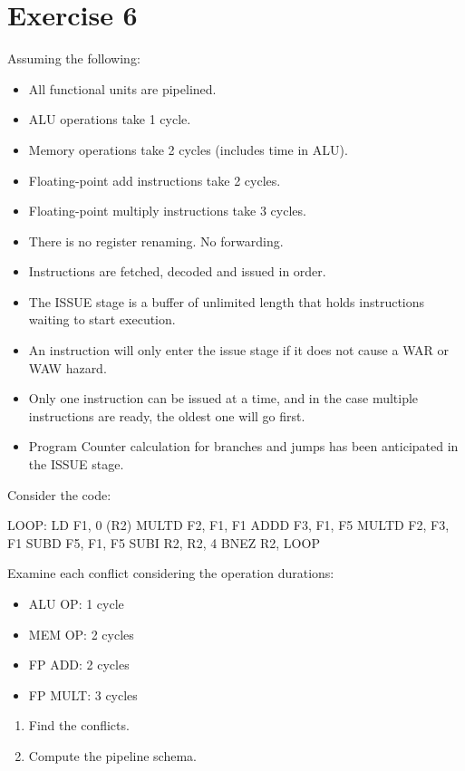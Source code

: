 \section{Exercise 6}

Assuming the following:
\begin{itemize}
    \item All functional units are pipelined.
    \item ALU operations take 1 cycle.
    \item Memory operations take 2 cycles (includes time in ALU).
    \item Floating-point add instructions take 2 cycles.
    \item Floating-point multiply instructions take 3 cycles.
    \item There is no register renaming. No forwarding.
    \item Instructions are fetched, decoded and issued in order.
    \item The ISSUE stage is a buffer of unlimited length that holds instructions waiting to start execution.
    \item An instruction will only enter the issue stage if it does not cause a WAR or WAW hazard.
    \item Only one instruction can be issued at a time, and in the case multiple instructions are ready, the oldest one will go first.
    \item Program Counter calculation for branches and jumps has been anticipated in the ISSUE stage.
\end{itemize}
Consider the code:
\begin{verbnobox}[\verbarg]
LOOP:   LD F1, 0 (R2)
        MULTD F2, F1, F1
        ADDD F3, F1, F5
        MULTD F2, F3, F1
        SUBD F5, F1, F5
        SUBI R2, R2, 4
        BNEZ R2, LOOP
\end{verbnobox}
Examine each conflict considering the operation durations:
\begin{itemize}
    \item ALU OP: 1 cycle
    \item MEM OP: 2 cycles
    \item FP ADD: 2 cycles
    \item FP MULT: 3 cycles
\end{itemize}
\begin{enumerate}
    \item Find the conflicts.
    \item Compute the pipeline schema.
\end{enumerate}

